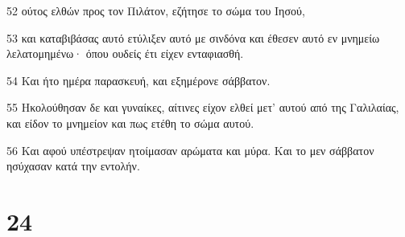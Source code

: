 \par 52 ούτος ελθών προς τον Πιλάτον, εζήτησε το σώμα του Ιησού,
\par 53 και καταβιβάσας αυτό ετύλιξεν αυτό με σινδόνα και έθεσεν αυτό εν μνημείω λελατομημένω· όπου ουδείς έτι είχεν ενταφιασθή.
\par 54 Και ήτο ημέρα παρασκευή, και εξημέρονε σάββατον.
\par 55 Ηκολούθησαν δε και γυναίκες, αίτινες είχον ελθεί μετ' αυτού από της Γαλιλαίας, και είδον το μνημείον και πως ετέθη το σώμα αυτού.
\par 56 Και αφού υπέστρεψαν ητοίμασαν αρώματα και μύρα. Και το μεν σάββατον ησύχασαν κατά την εντολήν.

\chapter{24}

